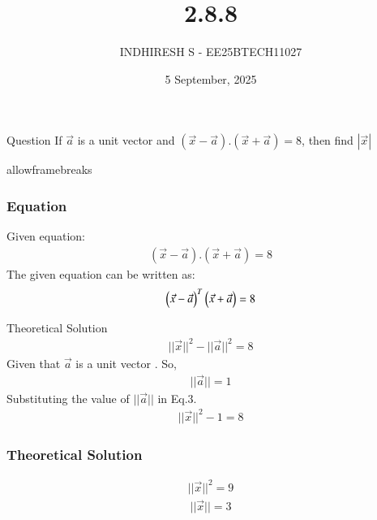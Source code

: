 \documentclass{beamer}
\title %
{2.8.8}
\date{5 September, 2025}
\author %
{INDHIRESH S - EE25BTECH11027}
\begin{document}
\frame{\titlepage}
\begin{frame}{Question}
If $\vec{a}$ is a unit vector and $(\vec{x} -\vec{a}).(\vec{x}+\vec{a}) = 8$, then find $|\vec{x}|$\\
\end{frame}
\begin{frame}{allowframebreaks}
\frametitle{Equation}

    \centering
    
    \label{tab:parameters}
Given equation:
\begin{align}
     (\vec{x} -\vec{a}).(\vec{x}+\vec{a}) = 8
\end{align}
The given equation can be written as:
\begin{align}
   \begin{pmatrix}\Vec{x}-\Vec{a}\end{pmatrix}^T\begin{pmatrix}\Vec{x}+\Vec{a}\end{pmatrix}=8
\end{align}
   
\end{frame}


\begin{frame}{Theoretical Solution}
\begin{align}
    ||\Vec{x}||^2-||\Vec{a}||^2=8
\end{align}
Given that $\Vec{a}$ is a unit vector . So,
\begin{align}
    ||\Vec{a}||=1
\end{align}
Substituting the value of $||\Vec{a}||$ in Eq.3.
\begin{align}
    ||\Vec{x}||^2-1=8
\end{align}



\end{frame}
\begin{frame}
\frametitle{Theoretical Solution}
\begin{align}
    ||\Vec{x}||^2=9
\end{align}
\begin{align}
     ||\Vec{x}||=3
\end{align}

\end{frame}
\end{document}
